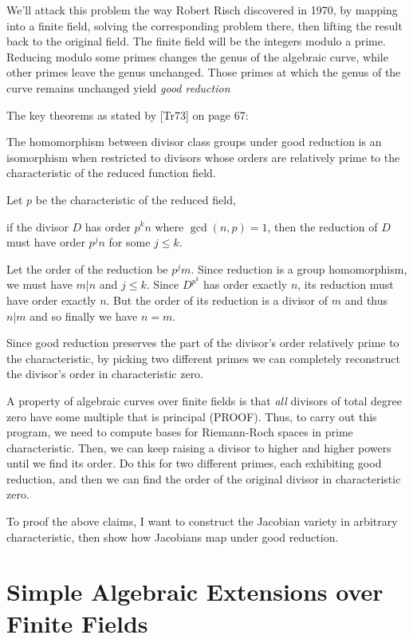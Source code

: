 We'll attack this problem the way Robert Risch discovered in 1970, by
mapping into a finite field, solving the corresponding problem there,
then lifting the result back to the original field.  The finite field
will be the integers modulo a prime.  Reducing modulo some primes
changes the genus of the algebraic curve, while other primes leave the
genus unchanged.  Those primes at which the genus of the curve remains
unchanged yield {\it good reduction}

The key theorems as stated by [Tr73] on page 67:

\theorem
The homomorphism between divisor class groups under good reduction
is an isomorphism when restricted to divisors whose orders are
relatively prime to the characteristic of the reduced function field.
\endtheorem

Let $p$ be the characteristic of the reduced field,

\theorem
if the divisor $D$ has order $p^k n$ where $\gcd(n,p)=1$, then
the reduction of $D$ must have order $p^j n$ for some $j\le k$.

\proof
Let the order of the reduction be $p^j m$.  Since reduction
is a group homomorphism, we must have $m|n$ and $j \le k$.
Since $D^{p^k}$ has order exactly $n$, its reduction
must have order exactly $n$.  But the order of its
reduction is a divisor of $m$ and thus $n|m$ and so
finally we have $n=m$.

\endtheorem


Since good reduction preserves the part of the divisor's order
relatively prime to the characteristic, by picking two different
primes we can completely reconstruct the divisor's order in
characteristic zero.

A property of algebraic curves over finite fields is that {\it all}
divisors of total degree zero have some multiple that is principal
(PROOF).  Thus, to carry out this program, we need to compute bases
for Riemann-Roch spaces in prime characteristic.  Then, we can keep
raising a divisor to higher and higher powers until we find its order.
Do this for two different primes, each exhibiting good reduction, and
then we can find the order of the original divisor in characteristic
zero.

To proof the above claims, I want to construct the Jacobian variety in
arbitrary characteristic, then show how Jacobians map under good
reduction.

\section{Simple Algebraic Extensions over Finite Fields}

